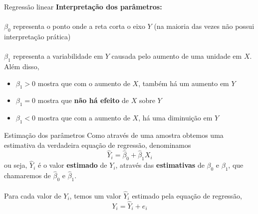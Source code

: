 \documentclass[10pt]{beamer}\usepackage[]{graphicx}\usepackage[]{color}
\theoremstyle{definition}
\begin{document}
\begin{frame}[fragile]{Regressão linear}
  \textbf{Interpretação dos parâmetros:} \\~\\
  $\beta_0$ representa o ponto onde a reta corta o eixo $Y$ (na maioria
  das vezes não possui interpretação prática) \\~\\
  $\beta_1$ representa a variabilidade em $Y$ causada pelo aumento de
  uma unidade em $X$. Além disso,
  \begin{itemize}
  \item $\beta_1 > 0$ mostra que com o aumento de $X$, também há um
    aumento em $Y$
  \item $\beta_1 = 0$ mostra que \textbf{não há efeito} de $X$ sobre $Y$
  \item $\beta_1 < 0$ mostra que com a aumento de $X$, há uma diminuição
    em $Y$
  \end{itemize}
\end{frame}


\begin{frame}[fragile]{Estimação dos parâmetros}
  Como através de uma amostra obtemos uma estimativa da verdadeira
  equação de regressão, denominamos
  \begin{equation*}
    \hat{Y}_i = \hat{\beta}_0 + \hat{\beta}_1 X_i
  \end{equation*}
  ou seja, $\hat{Y}_i$ é o valor \textbf{estimado} de $Y_i$, através
  das \textbf{estimativas} de $\beta_0$ e $\beta_1$, que chamaremos de
  $\hat{\beta}_0$ e $\hat{\beta}_1$. \\~\\
  Para cada valor de $Y_i$, temos um valor $\hat{Y}_i$ estimado pela
  equação de regressão,
  \begin{equation*}
    Y_i = \hat{Y}_i + e_i
  \end{equation*}
\end{frame}
\end{document}
